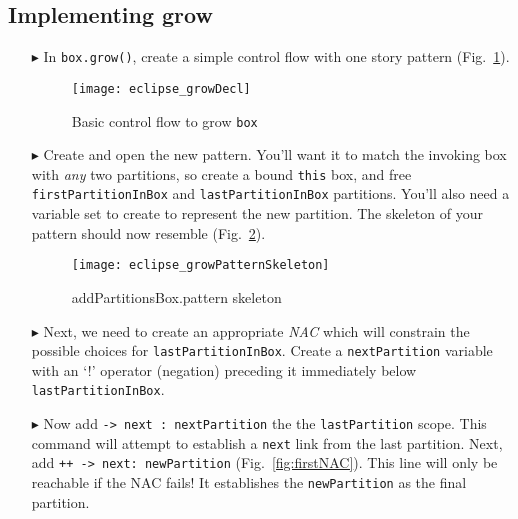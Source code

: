 \clearpage
\hypertarget{growBox tex}{}
\subsection{Implementing grow}
\texHeader

\vspace*{0.5cm}

\begin{itemize}

\item[$\blacktriangleright$] In \texttt{box.grow()}, create a simple control flow with one story pattern (Fig.~\ref{fig:growDecl}). 

\begin{figure}[htbp]
\begin{center}
  \texttt{[image: eclipse\_growDecl]}
  \caption{Basic control flow to grow \texttt{box} \update}
  \label{fig:growDecl}
\end{center}
\end{figure}

\item[$\blacktriangleright$] Create and open the new pattern. You'll want it to match the invoking box with \emph{any} two partitions, so create a bound
\texttt{this} box, and free \texttt{firstPartitionInBox} and \texttt{lastPartitionInBox} partitions. You'll also need a variable set to create to represent the
new partition. The skeleton of your pattern should now resemble (Fig.~\ref{fig:growPattSkel}).

\vspace{0.5cm}

\begin{figure}[htbp]
\begin{center}
  \texttt{[image: eclipse\_growPatternSkeleton]}
  \caption{addPartitionsBox.pattern skeleton}
  \label{fig:growPattSkel}
\end{center}
\end{figure}

\item[$\blacktriangleright$] Next, we need to create an appropriate \emph{NAC} which will constrain the possible choices for \texttt{lastPartitionInBox}.
Create a \texttt{nextPartition} variable with an `!' operator (negation) preceding it immediately below \texttt{last\-Part\-it\-ion\-In\-Box}.

\vspace{0.5cm}

\item[$\blacktriangleright$] Now add \texttt{-> next : nextPartition} the the \texttt{lastPartition} scope. This
command will attempt to establish a \texttt{next} link from the last partition. Next, add \texttt{++ -> next: newPartition} (Fig.~\ref{fig:firstNAC}).
This line will only be reachable if the NAC fails! It establishes the \texttt{newPartition} as the final partition.


\end{itemize}
